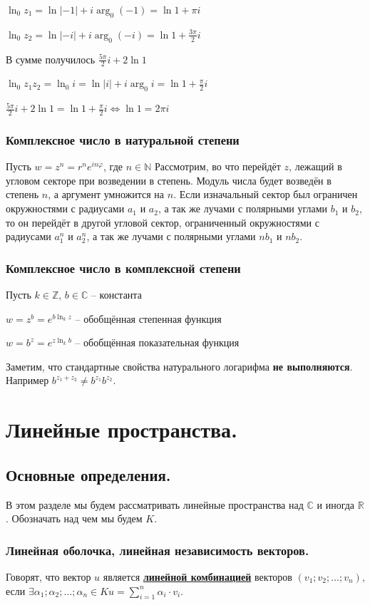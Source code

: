 \documentclass[twoside]{book}
\newcommand{\deff}[1]{\underline{\textbf{#1}}}
\begin{document}
$\ln_0{z_1}=\ln{|-1|}+i\arg_0{(-1)}=\ln{1} + \pi i$

$\ln_0{z_2}=\ln{|-i|}+i\arg_0{(-i)}=\ln{1} + \frac{3\pi}{2} i$

В сумме получилось $\frac{5\pi}{2}i + 2\ln{1}$

$\ln_0{z_1z_2}=\ln_0{i}=\ln{|i|} + i\arg_0{i} = \ln{1} + \frac{\pi}{2}i$

$\frac{5\pi}{2}i + 2\ln{1}=\ln{1} + \frac{\pi}{2}i \Leftrightarrow \ln{1}=2\pi i$

\subsubsection{Комплексное число в натуральной степени}
Пусть $w=z^n=r^ne^{in\varphi}$, где $n\in\mathbb{N}$
Рассмотрим, во что перейдёт $z$, лежащий в угловом секторе при возведении в степень. Модуль числа будет возведён в степень $n$, а аргумент умножится на $n$. Если изначальный сектор был ограничен окружностями с радиусами $a_1$ и $a_2$, а так же лучами с полярными углами $b_1$ и $b_2$, то он перейдёт в другой угловой сектор, ограниченный окружностями с радиусами $a_1^n$ и $a_2^n$, а так же лучами с полярными углами $nb_1$ и $nb_2$.

\subsubsection{Комплексное число в комплексной степени}
Пусть $k\in\mathbb{Z}$, $b\in\mathbb{C}$ -- константа

$w=z^b=e^{b\ln_k{z}}$ -- обобщённая степенная функция

$w=b^z=e^{z\ln_k{b}}$ -- обобщённая показательная функция

Заметим, что стандартные свойства натурального логарифма \textbf{не выполняются}. Например $b^{z_1 + z_2} \neq b^{z_1} b^{z_2}$.

\section{Линейные пространства.}
\subsection{Основные определения.}
В этом разделе мы будем рассматривать линейные пространства над $\mathbb C$ и иногда $\mathbb R$.  Обозначать над чем мы будем $K$.
\subsubsection{Линейная оболочка, линейная независимость векторов.}
Говорят, что вектор $u$ является \deff{линейной комбинацией} векторов $(v_1;v_2;\ldots;v_n)$, если  $\exists\alpha_1;\alpha_2;\ldots;\alpha_n\in K u=\sum\limits_{i=1}^n\alpha_i\cdot v_i$.
\end{document}
